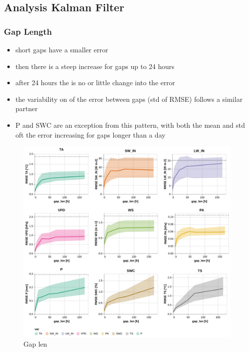\documentclass{article}
\newcommand{\imgwidth}{6in}
\let\Oldsubsection\subsection
\renewcommand{\subsection}{\FloatBarrier\Oldsubsection}
\begin{document}


\subsection{Analysis Kalman Filter}

\subsubsection{Gap Length}

\begin{itemize}
    \item short gaps have a smaller error
    \item then there is a steep increase for gaps up to 24 hours
    \item after 24 hours the is no or little change into the error
    \item the variability on of the error between gaps (std of RMSE) follows a similar partner
    \item P and SWC are an exception from this pattern, with both the mean and std oft the error increasing for gaps longer than a day
\end{itemize}




\begin{figure}
\centerline{\includegraphics[width=\imgwidth]{images2/gap_len}}
\caption{Gap len}
\label{fig:gap_len}
\end{figure}
\end{document}
